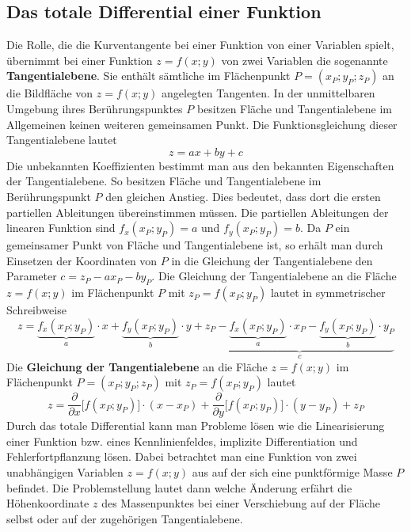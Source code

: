 \subsection{Das totale Differential einer Funktion}
Die Rolle, die die Kurventangente bei einer Funktion von einer Variablen spielt, übernimmt bei einer Funktion $z=f\left(x; y\right)$ von zwei Variablen die sogenannte \textbf{Tangentialebene}. Sie enthält sämtliche im Flächenpunkt $P=\left(x_P; y_P; z_P\right)$ an die Bildfläche von $z=f\left(x; y\right)$ angelegten Tangenten. In der unmittelbaren Umgebung ihres Berührungspunktes $P$ besitzen Fläche und Tangentialebene im Allgemeinen keinen weiteren gemeinsamen Punkt.
\newline\newline
Die Funktionsgleichung dieser Tangentialebene lautet
\begin{equation}
\boxed{z=ax+by+c}
\end{equation}
Die unbekannten Koeffizienten bestimmt man aus den bekannten Eigenschaften der Tangentialebene. So besitzen Fläche und Tangentialebene im Berührungspunkt $P$ den gleichen Anstieg. Dies bedeutet, dass dort die ersten partiellen Ableitungen übereinstimmen müssen. Die partiellen Ableitungen der linearen Funktion sind $f_x\left(x_P; y_P\right)=a$ und $f_y\left(x_P; y_P\right)=b$. Da $P$ ein gemeinsamer Punkt von Fläche und Tangentialebene ist, so erhält man durch Einsetzen der Koordinaten von $P$ in die Gleichung der Tangentialebene den Parameter $c=z_P-ax_P-by_P$.
\newline\newline
Die Gleichung der Tangentialebene an die Fläche $z=f\left(x; y\right)$ im Flächenpunkt $P$ mit $z_P=f\left(x_P; y_P\right)$ lautet in symmetrischer Schreibweise
\begin{equation}
\boxed{z=\underbrace{f_x\left(x_P; y_P\right)}_{a}\cdot x+\underbrace{f_y\left(x_P; y_P\right)}_{b}\cdot y+\underbrace{z_P-\underbrace{f_x\left(x_P; y_P\right)}_{a}\cdot x_P-\underbrace{f_y\left(x_P; y_P\right)}_{b}\cdot y_P}_{c}}
\end{equation}
Die \textbf{Gleichung der Tangentialebene} an die Fläche $z=f\left(x; y\right)$ im Flächenpunkt $P=\left(x_P; y_P; z_P\right)$ mit $z_P=f\left(x_P; y_P\right)$ lautet
\begin{equation}
\boxed{z=\dfrac{\partial}{\partial x}\Big[f\left(x_P; y_P\right)\Big]\cdot \left(x-x_P\right)+\dfrac{\partial}{\partial y}\Big[f\left(x_P; y_P\right)\Big]\cdot \left(y-y_P\right)+z_P}
\end{equation}
Durch das totale Differential kann man Probleme lösen wie die Linearisierung einer Funktion bzw. eines Kennlinienfeldes, implizite Differentiation und Fehlerfortpflanzung lösen. Dabei betrachtet man eine Funktion von zwei unabhängigen Variablen $z=f\left(x; y\right)$ aus auf der sich eine punktförmige Masse $P$ befindet. 
\newline\newline
Die Problemstellung lautet dann welche Änderung erfährt die Höhenkoordinate $z$ des Massenpunktes bei einer Verschiebung auf der Fläche selbst oder auf der zugehörigen Tangentialebene.
